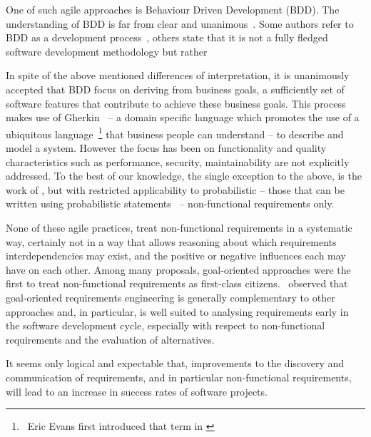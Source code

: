 \documentclass[dissertation,final]{softeng}
\begin{document}
One of such agile approaches is Behaviour Driven Development (BDD). The understanding of BDD is far from clear and unanimous~\citep{Solis0}. Some authors refer to BDD as a development process~\citep{Smart201410}, others state that it is not a fully fledged software development methodology but rather \emph{}

In spite of the above mentioned differences of interpretation, it is unanimously accepted that BDD focus on deriving from  business goals, a sufficiently set of software features that contribute to achieve these business goals. This process makes use of Gherkin~\citep{wynne2012cucumber} -- a domain specific language which promotes the use of a ubiquitous language~\footnote{~Eric Evans first introduced that term in  \citet{evans2004domain}}  that business people can understand -- to describe and model a system. However the focus has been on functionality and quality characteristics such as performance, security, maintainability are not explicitly addressed. To the best of our knowledge, the single exception to the above, is the work of \citet{barmi2011automated}, but with restricted applicability to probabilistic -- those that can be written using probabilistic statements~\citep{grunske2008specification} -- non-functional requirements only.

None of these agile practices, treat non-functional requirements in a systematic way, certainly not in a way that allows reasoning about which requirements interdependencies may exist, and the positive or negative influences each may have on each other. Among many proposals, goal-oriented approaches were the first to treat non-functional requirements as first-class citizens.~\citet{Mylopoulos:1999jh} observed that goal-oriented requirements engineering is generally complementary to other approaches and, in particular, is well suited to analysing requirements early in the software development cycle, especially with respect to non-functional requirements and the evaluation of alternatives. 

It seems only logical and expectable that, improvements to the discovery and communication of requirements, and in particular non-functional requirements, will lead to an increase in success rates of software projects.
\end{document}
